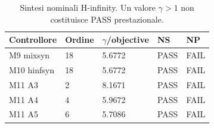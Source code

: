 \begin{table}[H]
\centering
\begin{tabular}{lllll}
\toprule
Controllore & Ordine & $\gamma$/objective & NS & NP \\
\midrule
M9 mixsyn & 18 & 5.6772 & PASS & FAIL \\
M10 hinfsyn & 18 & 5.6772 & PASS & FAIL \\
M11 A3 & 2 & 8.1671 & PASS & FAIL \\
M11 A4 & 4 & 5.9672 & PASS & FAIL \\
M11 A5 & 6 & 5.7086 & PASS & FAIL \\
\bottomrule
\end{tabular}
\caption{Sintesi nominali H-infinity. Un valore $\gamma>1$ non costituisce PASS prestazionale.}
\label{tab:hinf}
\end{table}
